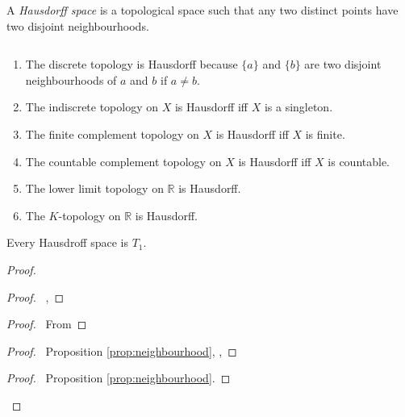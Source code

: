 \begin{df}
  A \emph{Hausdorff space} is a topological space such that any two distinct points have two disjoint neighbourhoods.
\end{df}

\begin{ex}$ $
  \begin{enumerate}
    \item
    The discrete topology is Hausdorff because $\{a\}$ and $\{b\}$ are two disjoint neighbourhoods of $a$ and $b$ if $a \neq b$.
    \item
    The indiscrete topology on $X$ is Hausdorff iff $X$ is a singleton.
    \item
    The finite complement topology on $X$ is Hausdorff iff $X$ is finite.
    \item
    The countable complement topology on $X$ is Hausdorff iff $X$ is countable.
    \item
    The lower limit topology on $\mathbb{R}$ is Hausdorff.
    \item
    The $K$-topology on $\mathbb{R}$ is Hausdorff.
  \end{enumerate}
\end{ex}

\begin{prop}
  Every Hausdroff space is $T_1$.
\end{prop}

\begin{proof}
  \pf
  \begin{proof}
    \pf\ , 
  \end{proof}
  \begin{proof}
    \pf\ From 
  \end{proof}
  \begin{proof}
    \pf\ Proposition \ref{prop:neighbourhood}, , 
  \end{proof}
  \qedstep
  \begin{proof}
    \pf\ Proposition \ref{prop:neighbourhood}.
  \end{proof}
\end{proof}

